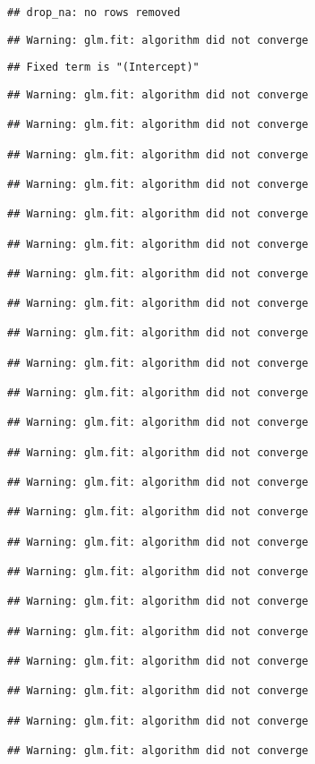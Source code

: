 \documentclass[
]{article}
\begin{document}
\begin{verbatim}
## drop_na: no rows removed
\end{verbatim}

\begin{verbatim}
## Warning: glm.fit: algorithm did not converge
\end{verbatim}

\begin{verbatim}
## Fixed term is "(Intercept)"
\end{verbatim}

\begin{verbatim}
## Warning: glm.fit: algorithm did not converge

## Warning: glm.fit: algorithm did not converge

## Warning: glm.fit: algorithm did not converge

## Warning: glm.fit: algorithm did not converge

## Warning: glm.fit: algorithm did not converge

## Warning: glm.fit: algorithm did not converge

## Warning: glm.fit: algorithm did not converge

## Warning: glm.fit: algorithm did not converge

## Warning: glm.fit: algorithm did not converge

## Warning: glm.fit: algorithm did not converge

## Warning: glm.fit: algorithm did not converge

## Warning: glm.fit: algorithm did not converge

## Warning: glm.fit: algorithm did not converge

## Warning: glm.fit: algorithm did not converge

## Warning: glm.fit: algorithm did not converge

## Warning: glm.fit: algorithm did not converge

## Warning: glm.fit: algorithm did not converge

## Warning: glm.fit: algorithm did not converge

## Warning: glm.fit: algorithm did not converge

## Warning: glm.fit: algorithm did not converge

## Warning: glm.fit: algorithm did not converge

## Warning: glm.fit: algorithm did not converge

## Warning: glm.fit: algorithm did not converge


\end{verbatim}
\end{document}
